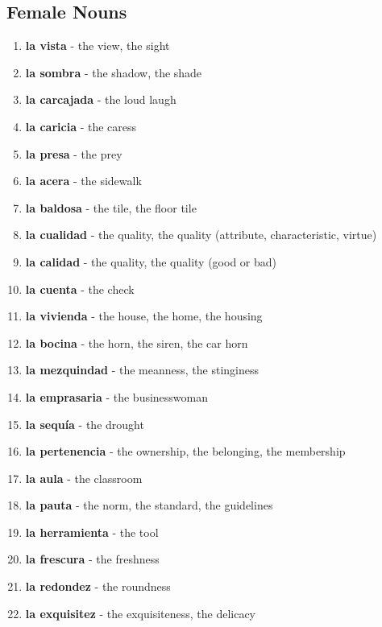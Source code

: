 \documentclass[12pt]{article}
\begin{document}
        \subsection{Female Nouns}
            \begin{enumerate}
                \item \textbf{la vista} - the view, the sight 
                \item \textbf{la sombra} - the shadow, the shade
                \item \textbf{la carcajada} - the loud laugh
                \item \textbf{la caricia} - the caress
                \item \textbf{la presa} - the prey
                \item \textbf{la acera} - the sidewalk
                \item \textbf{la baldosa} - the tile, the floor tile
                \item \textbf{la cualidad} - the quality, the quality (attribute, characteristic, virtue)
                \item \textbf{la calidad} - the quality, the quality (good or bad)
                \item \textbf{la cuenta} - the check
                \item \textbf{la vivienda} - the house, the home, the housing
                \item \textbf{la bocina} - the horn, the siren, the car horn
                \item \textbf{la mezquindad} - the meanness, the stinginess
                \item \textbf{la emprasaria} - the businesswoman
                \item \textbf{la sequía} - the drought
                \item \textbf{la pertenencia} - the ownership, the belonging, the membership
                \item \textbf{la aula} - the classroom
                \item \textbf{la pauta} - the norm, the standard, the guidelines
                \item \textbf{la herramienta} - the tool
                \item \textbf{la frescura} - the freshness
                \item \textbf{la redondez} - the roundness
                \item \textbf{la exquisitez} - the exquisiteness, the delicacy

\end{enumerate}
\end{document}
